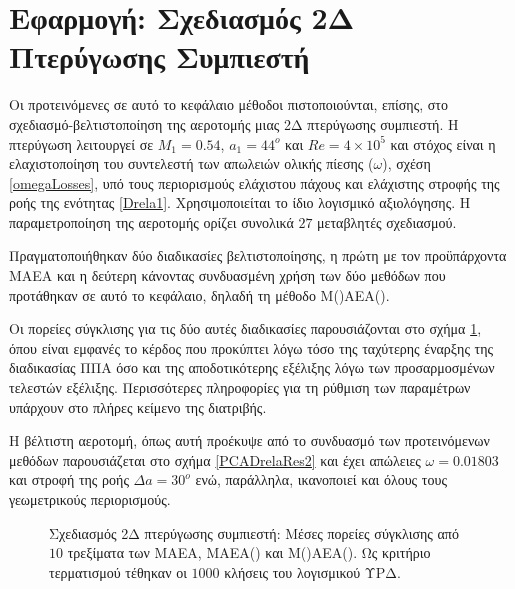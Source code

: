 \section{Εφαρμογή: Σχεδιασμός 2Δ Πτερύγωσης Συμπιεστή}
Οι προτεινόμενες σε αυτό το κεφάλαιο μέθοδοι πιστοποιούνται, επίσης, στο σχεδιασμό-βελτιστοποίηση της αεροτομής μιας 2Δ πτερύγωσης συμπιεστή. Η πτερύγωση λειτουργεί σε $M_1=0.54$, $a_1=44^o$ και $Re=4\!\times\!10^5$ και στόχος είναι η ελαχιστοποίηση του συντελεστή των απωλειών ολικής πίεσης ($\omega$), σχέση \ref{omegaLosses}, υπό τους περιορισμούς ελάχιστου πάχους και ελάχιστης στροφής της ροής της ενότητας \ref{Drela1}. Χρησιμοποιείται το ίδιο λογισμικό αξιολόγησης. Η παραμετροποίηση της αεροτομής ορίζει συνολικά $27$ μεταβλητές σχεδιασμού.  

Πραγματοποιήθηκαν δύο διαδικασίες βελτιστοποίησης, η πρώτη με τον προϋπάρχοντα ΜΑΕΑ και η δεύτερη κάνοντας συνδυασμένη χρήση των δύο μεθόδων που προτάθηκαν σε αυτό το κεφάλαιο, δηλαδή τη μέθοδο Μ()ΑΕΑ(). 
   
Οι πορείες σύγκλισης για τις δύο αυτές διαδικασίες παρουσιάζονται στο σχήμα \ref{PCADrelaRes}, όπου είναι εμφανές το κέρδος που προκύπτει λόγω τόσο της ταχύτερης έναρξης της διαδικασίας ΠΠΑ όσο και της αποδοτικότερης εξέλιξης λόγω των προσαρμοσμένων τελεστών εξέλιξης. Περισσότερες πληροφορίες για τη ρύθμιση των παραμέτρων υπάρχουν στο πλήρες κείμενο της διατριβής.   
  

Η βέλτιστη αεροτομή, όπως αυτή προέκυψε από το συνδυασμό των προτεινόμενων μεθόδων παρουσιάζεται στο σχήμα \ref{PCADrelaRes2} και έχει απώλειες $\omega\!=\!0.01803$ και στροφή της ροής $\Delta a\!=\!30^o$ ενώ, παράλληλα, ικανοποιεί και όλους τους γεωμετρικούς περιορισμούς.  

\begin{figure}[h!]
\begin{minipage}[b]{1\linewidth}
 \centering
\end{minipage}
\caption{Σχεδιασμός 2Δ πτερύγωσης συμπιεστή: Μέσες πορείες σύγκλισης από $10$ τρεξίματα των ΜΑΕΑ, ΜΑΕΑ() και  Μ()ΑΕΑ(). Ως κριτήριο τερματισμού τέθηκαν οι $1000$ κλήσεις του λογισμικού ΥΡΔ.} 
\label{PCADrelaRes}
\end{figure}


